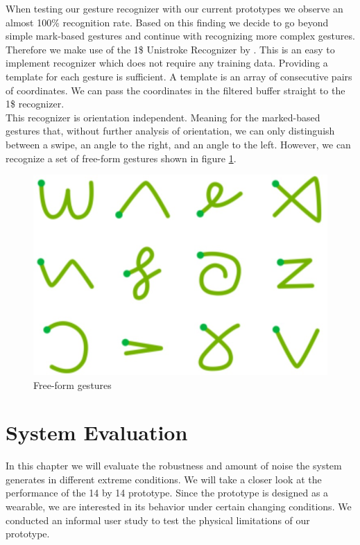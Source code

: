 When testing our gesture recognizer with our current prototypes we observe an almost 100\% recognition rate. Based on this finding we decide to go beyond simple mark-based gestures and continue with recognizing  more complex gestures. Therefore we make use of the 1\$ Unistroke Recognizer by \cite{Wobbrock}. This is an easy to implement recognizer which does not require any training data. Providing a template for each gesture is sufficient. A template is an array of consecutive pairs of coordinates. We can pass the coordinates in the filtered buffer straight to the 1\$ recognizer.
\\
This recognizer is orientation independent. Meaning for the marked-based gestures that, without further analysis of orientation, we can only distinguish between a swipe, an angle to the right, and an angle  to the left. However, we can recognize a set of free-form gestures shown in figure \ref{fig:freeFormGestures}.
\begin{figure}
\includegraphics[scale=0.3]{images/freeFormGestures.jpg}
\caption{Free-form gestures \cite{Bragdon}}
\label{fig:freeFormGestures}
\end{figure}


\chapter{System Evaluation}

In this chapter we will evaluate the robustness and amount of noise the system generates in different extreme conditions. We will take a closer look at the performance of the 14 by 14 prototype. Since the prototype is designed as a wearable, we are interested in its behavior under certain changing conditions. We conducted an informal user study to test the physical limitations of our prototype. 

